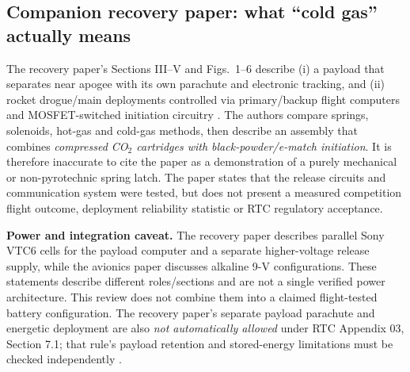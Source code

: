 \documentclass[10pt,a4paper]{article}
\begin{document}
\subsection{Companion recovery paper: what ``cold gas'' actually means}
The recovery paper's Sections III--V and Figs.~1--6 describe (i) a payload that separates near apogee with its own parachute and electronic tracking, and (ii) rocket drogue/main deployments controlled via primary/backup flight computers and MOSFET-switched initiation circuitry \cite{bakirci2022recovery}. The authors compare springs, solenoids, hot-gas and cold-gas methods, then describe an assembly that combines \emph{compressed CO$_2$ cartridges with black-powder/e-match initiation}. It is therefore inaccurate to cite the paper as a demonstration of a purely mechanical or non-pyrotechnic spring latch. The paper states that the release circuits and communication system were tested, but does not present a measured competition flight outcome, deployment reliability statistic or RTC regulatory acceptance.

\textbf{Power and integration caveat.} The recovery paper describes parallel Sony VTC6 cells for the payload computer and a separate higher-voltage release supply, while the avionics paper discusses alkaline 9-V configurations. These statements describe different roles/sections and are not a single verified power architecture. This review does not combine them into a claimed flight-tested battery configuration. The recovery paper's separate payload parachute and energetic deployment are also \emph{not automatically allowed} under RTC Appendix 03, Section 7.1; that rule's payload retention and stored-energy limitations must be checked independently \cite{rtc2027rules}.
\end{document}
